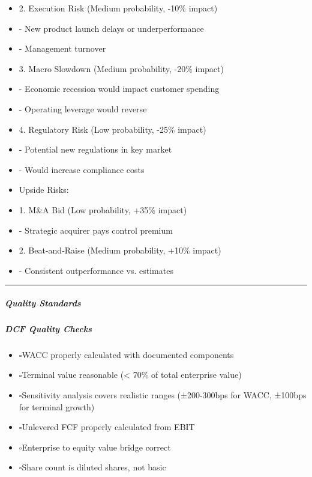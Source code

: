\documentclass[11pt]{article}
\newcommand{\UncheckedBox}{$\square$}
\begin{document}
\begin{itemize}[leftmargin=*,itemsep=2pt,topsep=2pt]
\item {} 2. Execution Risk (Medium probability, -10\% impact)
\item {} - New product launch delays or underperformance
\item {} - Management turnover
\item {} 3. Macro Slowdown (Medium probability, -20\% impact)
\item {} - Economic recession would impact customer spending
\item {} - Operating leverage would reverse
\item {} 4. Regulatory Risk (Low probability, -25\% impact)
\item {} - Potential new regulations in key market
\item {} - Would increase compliance costs
\item {} Upside Risks:
\item {} 1. M\&A Bid (Low probability, +35\% impact)
\item {} - Strategic acquirer pays control premium
\item {} 2. Beat-and-Raise (Medium probability, +10\% impact)
\item {} - Consistent outperformance vs. estimates
\end{itemize}

\vspace{0.5em}\hrule\vspace{0.5em}

\subparagraph{Quality Standards}\mbox{}\par

\subparagraph{DCF Quality Checks}\mbox{}\par
\begin{itemize}[leftmargin=*,itemsep=2pt,topsep=2pt]
\item {} \UncheckedBox WACC properly calculated with documented components
\item {} \UncheckedBox Terminal value reasonable (< 70\% of total enterprise value)
\item {} \UncheckedBox Sensitivity analysis covers realistic ranges (±200-300bps for WACC, ±100bps for terminal growth)
\item {} \UncheckedBox Unlevered FCF properly calculated from EBIT
\item {} \UncheckedBox Enterprise to equity value bridge correct
\item {} \UncheckedBox Share count is diluted shares, not basic
\end{itemize}
\end{document}
